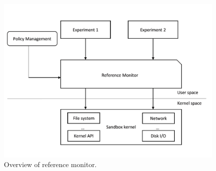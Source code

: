 \begin{figure}%
\centering
\includegraphics[width=0.8\columnwidth]{figure/referencemonitor.png}
\caption{Overview of reference monitor.}
\label{fig-reference}
\end{figure}

